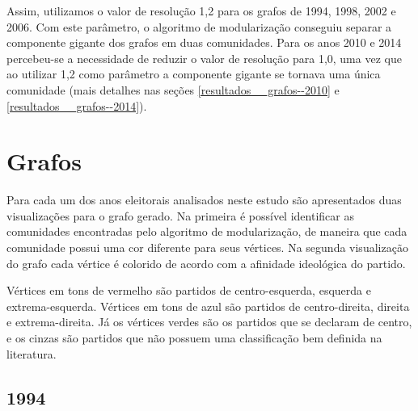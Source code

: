 Assim, utilizamos o valor de resolução 1,2 para os grafos de 1994, 1998, 2002 e 2006. Com este parâmetro, o algoritmo de modularização conseguiu separar a componente gigante dos grafos em duas comunidades. Para os anos 2010 e 2014 percebeu-se a necessidade de reduzir o valor de resolução para 1,0, uma vez que ao utilizar 1,2 como parâmetro a componente gigante se tornava uma única comunidade (mais detalhes nas seções \ref{resultados__grafos--2010} e \ref{resultados__grafos--2014}).

\section{Grafos}
\label{resultados__grafos}
Para cada um dos anos eleitorais analisados neste estudo são apresentados duas visualizações para o grafo gerado. Na primeira é possível identificar as comunidades encontradas pelo algoritmo de modularização, de maneira que cada comunidade possui uma cor diferente para seus vértices. Na segunda visualização do grafo cada vértice é colorido de acordo com a afinidade ideológica do partido.

Vértices em tons de vermelho são partidos de centro-esquerda, esquerda e extrema-esquerda. Vértices em tons de azul são partidos de centro-direita, direita e extrema-direita. Já os vértices verdes são os partidos que se declaram de centro, e os cinzas são partidos que não possuem uma classificação bem definida na literatura.

\subsection{1994}
\label{resultados__grafos--1994}

